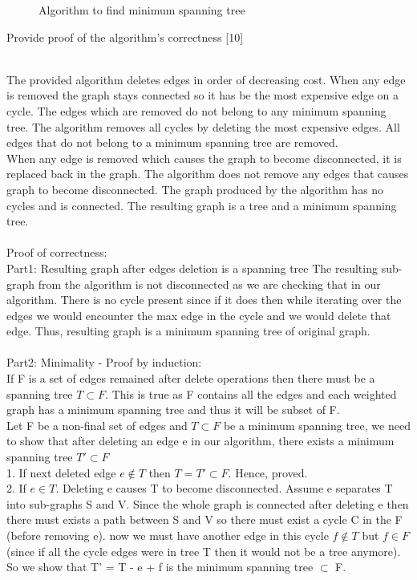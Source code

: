 \documentclass[12pt,letterpaper, onecolumn]{exam}
\begin{document}
\begin{questions}
\begin{figure}
            \caption{Algorithm to find minimum spanning tree}
            \label{fig:galaxy}
        \end{figure}
\pagebreak
\question Provide proof of the algorithm's correctness [10]
\begin{solution}
\\
The provided algorithm deletes edges in order of
decreasing cost. When any edge is removed the graph stays
connected so it has be the most expensive edge on a cycle.
The edges which are removed do not belong to any minimum spanning tree. The  algorithm removes all cycles by deleting the most expensive edges. All edges that do not belong to a minimum spanning tree are removed.\\
When any edge is removed which causes the graph to become disconnected, it is replaced back in the graph. The  algorithm does not remove any edges that causes graph to become disconnected. The graph produced by the algorithm has no cycles and is connected. The resulting graph is a tree and a minimum spanning tree.\\
\\
Proof of correctness:\\
Part1: Resulting graph after edges deletion is a spanning tree
The resulting sub-graph from the algorithm is not disconnected as we are checking that in our algorithm. There is no cycle present since if it does then while iterating over the edges we would encounter the max edge in the cycle and we would delete that edge. Thus, resulting graph is a minimum spanning tree of original graph.\\
\\
Part2: Minimality - Proof by induction:\\
If F is a set of edges remained after delete operations then there must be a spanning tree $T \subset F$. This is true as F contains all the edges and each weighted graph has a minimum spanning tree and thus it will be subset of F.\\
Let F be a non-final set of edges and $T\subset F$ be a minimum spanning tree, we need to show that after deleting an edge e in our algorithm, there exists a minimum spanning tree $T' \subset F$\\
1. If next deleted edge $e \notin T$ then $T=T' \subset F$. Hence, proved.\\
2. If $e \in T$. Deleting e causes T to become disconnected. Assume e separates T into sub-graphs S and V. Since the whole graph is connected after deleting e then there must exists a path between S and V so there must exist a cycle C in the F (before removing e). now we must have another edge in this cycle $f \notin T$ but $f \in F$ (since if all the cycle edges were in tree T then it would not be a tree anymore). So we show that T' = T - e + f is the minimum spanning tree $\subset$ F. 

\end{solution}
\end{questions}
\end{document}

